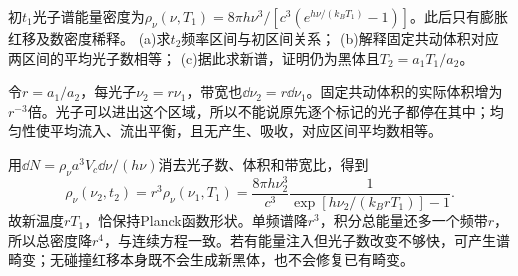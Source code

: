 \begin{exercise}
初$t_1$光子谱能量密度为$\rho_\nu(\nu,T_1)=8\pi h\nu^3/[c^3(e^{h\nu/(k_BT_1)}-1)]$。此后只有膨胀红移及数密度稀释。
(a)求$t_2$频率区间与初区间关系；
(b)解释固定共动体积对应两区间的平均光子数相等；
(c)据此求新谱，证明仍为黑体且$T_2=a_1T_1/a_2$。
\end{exercise}
\begin{solution}
令$r=a_1/a_2$，每光子$\nu_2=r\nu_1$，带宽也$\dd\nu_2=r\dd\nu_1$。固定共动体积的实际体积增为$r^{-3}$倍。光子可以进出这个区域，所以不能说原先逐个标记的光子都停在其中；均匀性使平均流入、流出平衡，且无产生、吸收，对应区间平均数相等。

用$\dd N=\rho_\nu a^3V_c\dd\nu/(h\nu)$消去光子数、体积和带宽比，得到
\[
 \rho_\nu(\nu_2,t_2)=r^3\rho_\nu(\nu_1,T_1)
 =\frac{8\pi h\nu_2^3}{c^3}
 \frac1{\exp[h\nu_2/(k_BrT_1)]-1}.
\]
故新温度$rT_1$，恰保持Planck函数形状。单频谱降$r^3$，积分总能量还多一个频带$r$，所以总密度降$r^4$，与连续方程一致。若有能量注入但光子数改变不够快，可产生谱畸变；无碰撞红移本身既不会生成新黑体，也不会修复已有畸变。
\end{solution}
